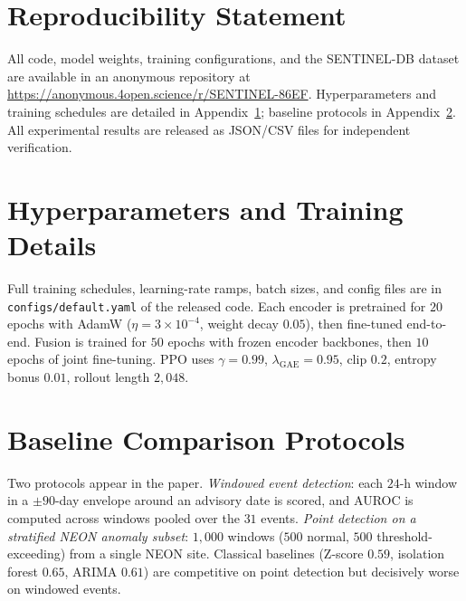 \documentclass{article}
\begin{document}
\section*{Reproducibility Statement}

All code, model weights, training configurations, and the SENTINEL-DB dataset are available in an anonymous repository at \url{https://anonymous.4open.science/r/SENTINEL-86EF}. Hyperparameters and training schedules are detailed in Appendix~\ref{app:hp}; baseline protocols in Appendix~\ref{app:baselines}. All experimental results are released as JSON/CSV files for independent verification.

\FloatBarrier




\clearpage
\appendix

\section{Hyperparameters and Training Details}
\label{app:hp}

Full training schedules, learning-rate ramps, batch sizes, and config files are in \texttt{configs/default.yaml} of the released code. Each encoder is pretrained for $20$ epochs with AdamW ($\eta\!=\!3{\times}10^{-4}$, weight decay $0.05$), then fine-tuned end-to-end. Fusion is trained for $50$ epochs with frozen encoder backbones, then $10$ epochs of joint fine-tuning. PPO uses $\gamma\!=\!0.99$, $\lambda_\text{GAE}\!=\!0.95$, clip $0.2$, entropy bonus $0.01$, rollout length $2{,}048$.

\section{Baseline Comparison Protocols}
\label{app:baselines}

Two protocols appear in the paper. \emph{Windowed event detection}: each $24$-h window in a $\pm 90$-day envelope around an advisory date is scored, and AUROC is computed across windows pooled over the $31$ events. \emph{Point detection on a stratified NEON anomaly subset}: $1{,}000$ windows ($500$ normal, $500$ threshold-exceeding) from a single NEON site. Classical baselines (Z-score $0.59$, isolation forest $0.65$, ARIMA $0.61$) are competitive on point detection but decisively worse on windowed events.
\end{document}
